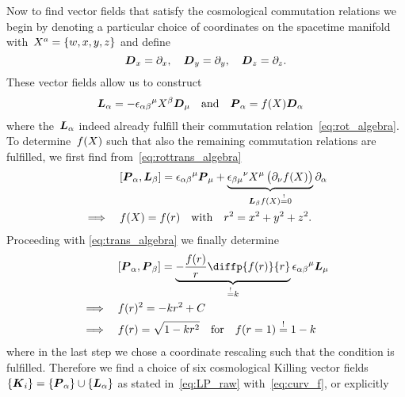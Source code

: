 Now to find vector fields that satisfy the cosmological commutation relations we begin by denoting a particular choice of coordinates on the spacetime manifold with~${X^a=\{w,x,y,z\}}$ and define
\begin{equation}
	\boldsymbol{D}_x=\partial_x
	\mathpunct{,}\quad \boldsymbol{D}_y=\partial_y
	\mathpunct{,}\quad \boldsymbol{D}_z=\partial_z
	\mathpunct{.}
\end{equation}
These vector fields allow us to construct
\begin{align}\label{eq:LP_raw}
	\boldsymbol{L}_\alpha=-{\epsilon_{\alpha\beta}}^\mu X^\beta\boldsymbol{D}_\mu
	\quad &\text{and} \quad
	\boldsymbol{P}_\alpha=f(X)\boldsymbol{D}_\alpha
\end{align}
where the~$\boldsymbol{L}_\alpha$ indeed already fulfill their commutation relation~\eqref{eq:rot_algebra}. To determine~$f(X)$ such that also the remaining commutation relations are fulfilled, we first find from~\eqref{eq:rottrans_algebra}
\begin{align}
	&[{\boldsymbol{P}_\alpha},{\boldsymbol{L}_\beta}]={\epsilon_{\alpha\beta}}^\mu\boldsymbol{P}_\mu+\underbrace{{\epsilon_{\beta\mu}}^\nu X^\mu\left(\partial_\nu f(X)\right)}_{\boldsymbol{L}_\beta f(X)\overset{!}{=}0}\partial_\alpha\\
	\implies \quad &f(X)=f(r) \quad \text{with} \quad r^2=x^2+y^2+z^2
	\mathpunct{.}
\end{align}
Proceeding with \eqref{eq:trans_algebra} we finally determine
\begin{align}
	&\comm{\vect{\Pvec}_\alpha}{\vect{\Pvec}_\beta}=\underbrace{-\frac{\func\of{\coordr}}{\coordr}\diffp{\func\of{\coordr}}{\coordr}}_{\overset{!}{=}\spatcurv}{\levciv_{\alpha\beta}}^\mu\vect{\Lvec}_\mu\\
	\implies \quad &\func\of{\coordr}^2=-\spatcurv\coordr^2+\Const\\
	\implies \quad &\func\of{\coordr}=\sqrt{\curvfact} \quad \text{for} \quad \func\of{\coordr=1}\overset{!}{=}1-\spatcurv \label{eq:curv_f}
\end{align}
where in the last step we chose a coordinate rescaling such that the condition is fulfilled. Therefore we find a choice of six cosmological Killing vector fields~$\left\{\boldsymbol{K}_i\right\}=\left\{\boldsymbol{P}_\alpha\right\}\cup\left\{\boldsymbol{L}_\alpha\right\}$ as stated in~\eqref{eq:LP_raw} with~\eqref{eq:curv_f}, or explicitly
